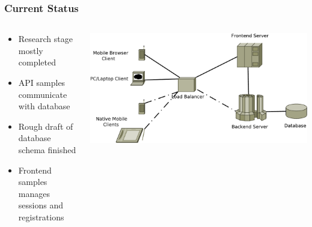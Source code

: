 \documentclass[utf8]{beamer}
\begin{document}
\begin{frame}
\frametitle{Current Status}
\begin{columns}
	\begin{column}{0.6\textwidth}
	\begin{itemize}
		\item Research stage mostly completed
		\item API samples communicate with database
		\item Rough draft of database schema finished
		\item Frontend samples manages sessions and registrations
	\end{itemize}
	\end{column}

	\begin{column}{0.4\textwidth}
		\includegraphics[width=\textwidth]{img/arch.pdf}
	\end{column}
\end{columns}
\end{frame}
\end{document}
